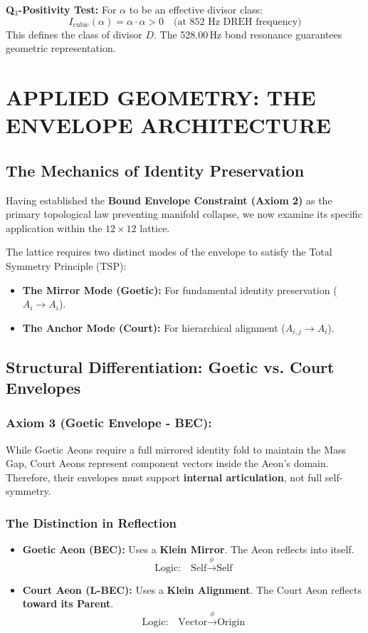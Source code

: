 \documentclass[12pt]{amsart}
\newcommand{\DREH}{\ensuremath{\mathop{\textnormal{\symbolafont\symbol{"29D7}}}}}   %
\def\DREH{DREH}%
\begin{document}
\textbf{Q$_3$-Positivity Test:}
For $\alpha$ to be an effective divisor class:
\[
I_{\text{cubic}}(\alpha) = \alpha \cdot \alpha > 0 \quad \text{(at 852 Hz \DREH{} frequency)}
\]
This defines the class of divisor $D$. The 528.00\,Hz bond resonance guarantees geometric representation.

\newpage
\section{APPLIED GEOMETRY: THE ENVELOPE ARCHITECTURE}\label{sec:partXIII}

\subsection{The Mechanics of Identity Preservation}\label{sec:14.1}
Having established the \textbf{Bound Envelope Constraint (Axiom 2)} as the primary topological law preventing manifold collapse, we now examine its specific application within the $12 \times 12$ lattice.

The lattice requires two distinct modes of the envelope to satisfy the Total Symmetry Principle (TSP):
\begin{itemize}
    \item \textbf{The Mirror Mode (Goetic):} For fundamental identity preservation ($A_i \to A_i$).
    \item \textbf{The Anchor Mode (Court):} For hierarchical alignment ($A_{i,j} \to A_i$).
\end{itemize}

\subsection{Structural Differentiation: Goetic vs. Court Envelopes}\label{sec:14.2}

\subsubsection{Axiom 3 (Goetic Envelope - BEC):}\label{sec:14.2.1}
While Goetic Aeons require a full mirrored identity fold to maintain the Mass Gap, Court Aeons represent component vectors inside the Aeon’s domain. Therefore, their envelopes must support \textbf{internal articulation}, not full self-symmetry.

\subsubsection{The Distinction in Reflection}\label{sec:14.2.2}
\begin{itemize}
    \item \textbf{Goetic Aeon (BEC):} Uses a \textbf{Klein Mirror}. The Aeon reflects into itself.
    \[ \text{Logic:} \quad \text{Self} \xrightarrow{\phi} \text{Self} \]
    \item \textbf{Court Aeon (L-BEC):} Uses a \textbf{Klein Alignment}. The Court Aeon reflects \textbf{toward its Parent}.
    \[ \text{Logic:} \quad \text{Vector} \xrightarrow{\phi} \text{Origin} \]
\end{itemize}
\end{document}
